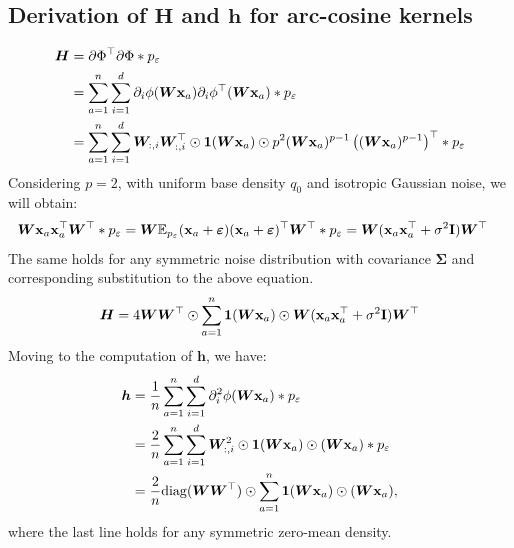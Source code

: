 \subsection{Derivation of \texorpdfstring{$\bm H$ and $\bm h$
for arc-cosine kernels}.}
\label{sec:Hh_arccos}
\begin{align*}
        {\bm H}
        &= \partial \Phi^{\top}\partial \Phi * p_{\varepsilon}\\
        &= \sum\limits_{a = 1}^n\sum\limits_{i = 1}^d \partial_i \phi(\bm{W}{\bf x}_a)\partial_i \phi^{\top}(\bm{W}{\bf x}_a) * p_{\varepsilon}\\
        &= \sum\limits_{a = 1}^n\sum\limits_{i = 1}^d \bm{W}_{:, i}\bm{W}_{:, i}^\top \odot {\bf 1}(\bm{W}{\bf x}_a) \odot p^2(\bm{W}{\bf x}_a)^{p - 1}\left((\bm{W}{\bf x}_a)^{p - 1}\right)^{\top} * p_{\varepsilon}\\
        \label{eq:H_derivation}
    \end{align*}
    Considering $p = 2$, with uniform base density $q_0$ and isotropic Gaussian noise, we will obtain:
    \begin{align*}
        \bm{W}{\bf x}_a{\bf x}_a^{\top}\bm{W}^{\top} * p_{\varepsilon}
        & = \bm{W}\mathbb{E}_{p_{\varepsilon}}({\bf x}_a + {\bm \varepsilon})({\bf x}_a + {\bm \varepsilon})^{\top}\bm{W}^{\top} * p_{\varepsilon} = \bm{W}({\bf x}_a{\bf x}_a^{\top} + \sigma^2{\bf I})\bm{W}^{\top}
    \end{align*}
    The same holds for any symmetric noise distribution with covariance ${\bm \Sigma}$ and corresponding substitution to the above equation.
    \begin{equation}
        {\bm H} = 4\bm{W}\bm{W}^{\top} \odot \sum_{a = 1}^n{\bf 1}(\bm{W}{\bf x}_a) \odot \bm{W}({\bf x}_a{\bf x}_a^{\top} + \sigma^2{\bf I})\bm{W}^{\top}
    \end{equation}
    Moving to the computation of ${\bm h}$, we have:
    \begin{align*}
        {\bm h}
        &= \frac{1}{n}\sum_{a = 1}^n\sum_{i = 1}^d \partial_i^2 \phi(\bm{W}{\bf x}_a) * p_{\varepsilon}\\
        &= \frac{2}{n}\sum_{a = 1}^n\sum_{i = 1}^d \bm{W}_{:, i}^2 \odot {\bf 1}(\bm{W}{\bf x}_a) \odot (\bm{W}{\bf x}_a) * p_{\varepsilon}\\
        &= \frac{2}{n}{\rm diag}(\bm{W}\bm{W}^{\top}) \odot \sum_{a = 1}^n {\bf 1}(\bm{W}{\bf x}_a) \odot (\bm{W}{\bf x}_a),
    \end{align*}
    where the last line holds for any symmetric zero-mean density.

